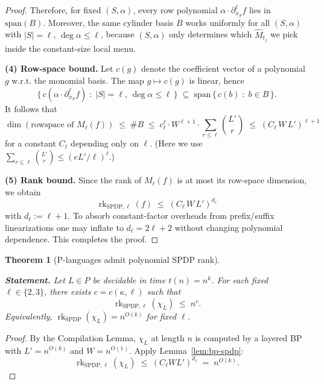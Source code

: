\documentclass[12pt]{article}
\newtheorem{theorem}{Theorem}
\theoremstyle{definition}
\theoremstyle{definition}
\theoremstyle{remark}
\theoremstyle{remark}
\begin{document}
\begin{proof}
Therefore, for fixed $(S,\alpha)$, every row polynomial $\alpha \cdot \partial_{x_S}^\ell f$ lies in $\mathrm{span}(B)$. Moreover, the same cylinder basis $B$ works uniformly for all $(S,\alpha)$ with $|S| = \ell$, $\deg \alpha \le \ell$, because $(S,\alpha)$ only determines which $\widehat{M}_{t_j}$ we pick inside the constant-size local menu.

\textbf{(4) Row-space bound.}
Let $c(g)$ denote the coefficient vector of a polynomial $g$ w.r.t. the monomial basis. The map $g \mapsto c(g)$ is linear, hence
\[
\{\, c(\alpha \cdot \partial_{x_S}^\ell f) \;:\; |S| = \ell,\, \deg \alpha \le \ell\,\} \;\subseteq\; \mathrm{span}\, \{\, c(b) \;:\; b \in B\,\}.
\]
It follows that
\[
\dim(\text{rowspace of }M_\ell(f)) \;\le\; \#B \;\le\; c_\ell^\ell \cdot W^{\ell+1} \cdot \sum_{r \le \ell} \binom{L'}{r} \;\le\; (C_\ell\, W\, L')^{\ell+1}
\]
for a constant $C_\ell$ depending only on $\ell$. (Here we use $\sum_{r \le \ell} \binom{L'}{r} \le (eL'/\ell)^\ell$.)

\textbf{(5) Rank bound.}
Since the rank of $M_\ell(f)$ is at most its row-space dimension, we obtain
\[
\operatorname{rk}_{\mathrm{SPDP},\ell}(f) \;\le\; (C_\ell\, W\, L')^{d_\ell}
\]
with $d_\ell := \ell+1$. To absorb constant-factor overheads from prefix/suffix linearizations one may inflate to $d_\ell = 2\ell+2$ without changing polynomial dependence. This completes the proof.
\end{proof}

\begin{theorem}[P-languages admit polynomial SPDP rank]\label{thm:p-polynomial-rank}

\textbf{Statement.}
Let $L \in P$ be decidable in time $t(n) = n^k$. For each fixed $\ell \in \{2,3\}$, there exists $c = c(\kappa,\ell)$ such that
\[
\operatorname{rk}_{\mathrm{SPDP},\ell}(\chi_L) \;\le\; n^c.
\]
Equivalently, $\operatorname{rk}_{\mathrm{SPDP}}(\chi_L) = n^{O(k)}$ for fixed $\ell$.
\end{theorem}

\begin{proof}
By the Compilation Lemma, $\chi_L$ at length $n$ is computed by a layered BP with $L' = n^{O(k)}$ and $W = n^{O(1)}$. Apply Lemma~\ref{lem:bp-spdp}:
\[
\operatorname{rk}_{\mathrm{SPDP},\ell}(\chi_L) \;\le\; (C_\ell W L')^{d_\ell} \;=\; n^{O(k)}.
\]
\end{proof}
\end{document}
